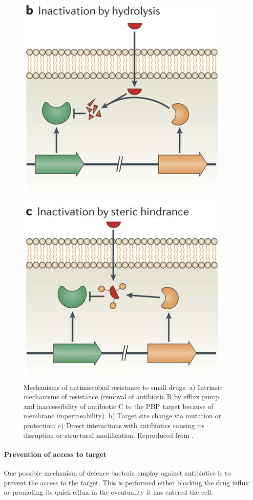 \begin{figure}[h]
\begin{center}
\includegraphics[height = 0.36\textheight]{pics/amr4_half}
\caption[Mechanisms of antimicrobial resistance to small drugs]{Mechanisms of antimicrobial resistance to small drugs. a) Intrinsic mechanisms of resistance (removal of antibiotic B by efflux pump and inaccessibility of antibiotic C to the PBP target because of membrane impermeability). b) Target site change via mutation or protection. c) Direct interactions with antibiotics causing its disruption or structural modification. Reproduced from \cite{Blair2014}.} \label{fig:amr}
\end{center}
\end{figure}


\paragraph{Prevention of access to target}
One possible mechanism of defence bacteria employ against antibiotics is to prevent the access to the target. This is performed either blocking the drug influx or promoting its quick efflux in the eventuality it has entered the cell.

